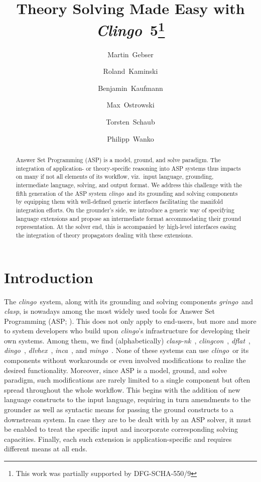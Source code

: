 \documentclass[a4paper,USenglish]{oasics-v2016}
\title{Theory Solving Made Easy with \textit{Clingo}~5\footnote{This work was partially supported by DFG-SCHA-550/9}}
\author[1]{Martin~Gebser}
\author[1]{Roland~Kaminski}
\author[1]{Benjamin~Kaufmann}
\author[1]{Max~Ostrowski}
\author[1,2]{Torsten~Schaub}
\author[1]{Philipp~Wanko}
\affil[1]{University of Potsdam, Germany}
\affil[2]{INRIA Rennes, France}
\newcommand{\sysfont}{\textit}
\newcommand{\clasp}{\sysfont{clasp}}
\newcommand{\clingcon}{\sysfont{clingcon}}
\newcommand{\clingo}{\sysfont{clingo}}
\newcommand{\dingo}{\sysfont{dingo}}
\newcommand{\dflat}{\sysfont{dflat}}
\newcommand{\dlvhex}{\sysfont{dlvhex}}
\newcommand{\gringo}{\sysfont{gringo}}
\newcommand{\inca}{\sysfont{inca}}
\newcommand{\mingo}{\sysfont{mingo}}
\begin{document}
\maketitle

\begin{abstract}
Answer Set Programming (ASP) is a model, ground, and solve paradigm.
The integration of application- or theory-specific reasoning into ASP systems thus impacts on many if not all elements of its workflow,
viz.\
input language,
grounding,
intermediate language,
solving, and
output format.
%
We address this challenge with the fifth generation of the ASP system \clingo\ and its grounding and solving components
by equipping them with well-defined generic interfaces facilitating the manifold integration efforts.
%
On the grounder's side, we introduce a generic way of specifying language extensions and 
propose an intermediate format accommodating their ground representation.
At the solver end, this is accompanied by high-level interfaces 
easing the integration of theory propagators dealing with these extensions.
\end{abstract}


\section{Introduction}\label{sec:introduction}

The \clingo\ system, along with its grounding and solving components \gringo\ and \clasp, %
is  nowadays among the most widely used tools for Answer Set Programming (ASP; \cite{lifschitz08b}).
This does not only apply to end-users, but more and more to system developers who build upon \clingo's
infrastructure for developing their own systems.
Among them, we find (alphabetically)
\clasp\emph{-nk}~\cite{eiererfi13a},
\clingcon~\cite{ostsch12a},
\dflat~\cite{abblchduhewo14a},
\dingo~\cite{jalini11a},
\dlvhex~\cite{eifikrre12a},
\inca~\cite{drewal12a}, and
\mingo~\cite{lijani12a}.
None of these systems can use \clingo\ or its components without workarounds or even involved modifications to realize the desired functionality.
%
Moreover, since ASP is a model, ground, and solve paradigm, such modifications are rarely limited to a single component
but often spread throughout the whole workflow.
This begins with the addition of new language constructs to the input language,
requiring in turn amendments to the grounder as well as
syntactic means for passing the ground constructs to a downstream system.
In case they are to be dealt with by an ASP solver,
it must be enabled to treat the specific input and incorporate corresponding solving capacities.
%
Finally,
each such extension is application-specific and requires different means at all ends.
\end{document}
